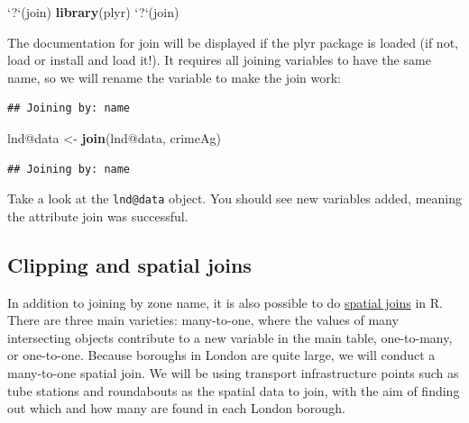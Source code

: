 \documentclass[]{article}
\newenvironment{Shaded}{}{}
\newcommand{\KeywordTok}[1]{\textcolor[rgb]{0.00,0.44,0.13}{\textbf{{#1}}}}
\newcommand{\DataTypeTok}[1]{\textcolor[rgb]{0.56,0.13,0.00}{{#1}}}
\newcommand{\StringTok}[1]{\textcolor[rgb]{0.25,0.44,0.63}{{#1}}}
\newcommand{\CommentTok}[1]{\textcolor[rgb]{0.38,0.63,0.69}{\textit{{#1}}}}
\newcommand{\NormalTok}[1]{{#1}}
\begin{document}
\begin{Shaded}
\begin{Highlighting}[]
\StringTok{`}\DataTypeTok{?}\StringTok{`}\NormalTok{(join)}
\KeywordTok{library}\NormalTok{(plyr)}
\StringTok{`}\DataTypeTok{?}\StringTok{`}\NormalTok{(join)}
\end{Highlighting}
\end{Shaded}

The documentation for join will be displayed if the plyr package is
loaded (if not, load or install and load it!). It requires all joining
variables to have the same name, so we will rename the variable to make
the join work:

\begin{Shaded}
\end{Shaded}

\begin{verbatim}
## Joining by: name
\end{verbatim}

\begin{Shaded}
\begin{Highlighting}[]
\NormalTok{lnd@data <-}\StringTok{ }\KeywordTok{join}\NormalTok{(lnd@data, crimeAg)}
\end{Highlighting}
\end{Shaded}

\begin{verbatim}
## Joining by: name
\end{verbatim}

Take a look at the \texttt{lnd@data} object. You should see new
variables added, meaning the attribute join was successful.

\subsection{Clipping and spatial
joins}\label{clipping-and-spatial-joins}

In addition to joining by zone name, it is also possible to do
\href{http://help.arcgis.com/en/arcgisdesktop/10.0/help/index.html\#//00080000000q000000}{spatial
joins} in R. There are three main varieties: many-to-one, where the
values of many intersecting objects contribute to a new variable in the
main table, one-to-many, or one-to-one. Because boroughs in London are
quite large, we will conduct a many-to-one spatial join. We will be
using transport infrastructure points such as tube stations and
roundabouts as the spatial data to join, with the aim of finding out
which and how many are found in each London borough.
\end{document}
